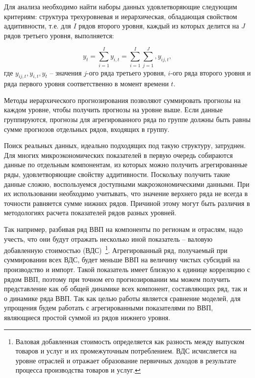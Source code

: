 \documentclass[12pt,a4paper, oneside]{extreport}
\begin{document}
Для анализа  необходимо найти наборы данных удовлетворяющие следующим критериям: 
структура трехуровневая и иерархическая, обладающая свойством аддитивности, т.е. для $I$ рядов второго уровня, каждый из которых делится на $J$ рядов третьего уровня, выполняется: 

\begin{equation}\label{key}
y_t = \sum_{i=1}^I y_{i,t} = \sum_{i=1}^I \sum_{j=1}^J, y_{ij,t} ,
\end{equation}
\noindent
где $y_{ij,t}, y_{i,t},  y_{t}  $ -- значения $j$-ого ряда третьего уровня, $i$-ого ряда второго уровня и ряда первого уровня соответственно в момент времени $t$. 

Методы иерархического прогнозирования позволяют суммировать прогнозы на каждом уровне, чтобы получить  прогнозы на уровне выше. Если  данные группируются, прогнозы для агрегированного  ряда по   группе должны быть равны сумме прогнозов отдельных рядов, входящих в группу.

Поиск реальных данных, идеально подходящих под такую структуру, затруднен. Для  многих микроэкономических показателей  в первую очередь собираются данные по отдельным компонентам, из которых  можно получить агрегированные ряды,  удовлетворяющие  свойству аддитивности. Поскольку получить  такие данные сложно, воспользуемся доступными  макроэкономическими данными. При их использовании  необходимо учитывать, что значение верхнего ряда не всегда  в точности  равняется  сумме нижних рядов. Причиной этому могут  быть  различия  в методологиях расчета показателей рядов разных уровней.

Так например, разбивая ряд ВВП на компоненты по регионам и отраслям, надо учесть, что  они будут отражать несколько иной показатель --  валовую добавленную стоимостью (ВДС)~\footnote{Валовая добавленная стоимость определяется как разность между выпуском товаров и услуг и их промежуточным потреблением. ВДС  исчисляется на уровне отраслей и отражает образование первичных доходов в результате процесса производства товаров и услуг.}. Агрегированный ряд, получаемый при суммировании всех ВДС, будет меньше ВВП на величину чистых субсидий на производство и импорт. Такой показатель имеет близкую к единице корреляцию с рядом ВВП, поэтому при точном его прогнозировании мы можем получить представление как об общей динамике всех компонент, составляющих ряд, так и о динамике ряда ВВП.  Так как целью работы является сравнение моделей, для упрощения будем работать с агрегированными показателями по ВВП, являющиеся простой суммой из рядов нижнего уровня. 
\end{document}
